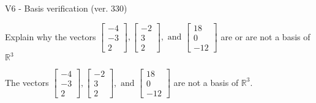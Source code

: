 \begin{exercise}
  \begin{exerciseTitle}V6 - Basis verification (ver. 330)\end{exerciseTitle}
  \begin{exerciseStatement}
    Explain why the vectors \(\left[\begin{array}{r}
-4 \\
-3 \\
2
\end{array}\right] , \left[\begin{array}{r}
-2 \\
3 \\
2
\end{array}\right] , \text{ and } \left[\begin{array}{r}
18 \\
0 \\
-12
\end{array}\right]\) are or are not a basis of \(\mathbb{R}^3\)	


  \end{exerciseStatement}
  \begin{exerciseAnswer}
   The vectors \(\left[\begin{array}{r}
-4 \\
-3 \\
2
\end{array}\right] , \left[\begin{array}{r}
-2 \\
3 \\
2
\end{array}\right] , \text{ and } \left[\begin{array}{r}
18 \\
0 \\
-12
\end{array}\right]\) 
  	 are not  a basis of \(\mathbb{R}^3\).
  


  \end{exerciseAnswer}
\end{exercise}